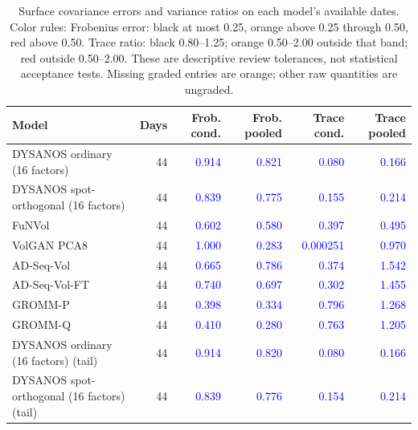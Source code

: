 \documentclass[11pt]{article}
\begin{document}
\begin{table}[H]\centering\small\setlength{\tabcolsep}{4pt}
\caption{Surface covariance errors and variance ratios on each model's available dates. Color rules: Frobenius error: black at most 0.25, orange above 0.25 through 0.50, red above 0.50. Trace ratio: black 0.80--1.25; orange 0.50--2.00 outside that band; red outside 0.50--2.00. These are descriptive review tolerances, not statistical acceptance tests. Missing graded entries are orange; other raw quantities are ungraded.}\label{tab:surface-covariance}
\begin{tabular}{@{}lrrrrr@{}}
\toprule
Model & Days & Frob. cond. & Frob. pooled & Trace cond. & Trace pooled \\
\midrule
DYSANOS ordinary (16 factors) & 44 & \textcolor{blue}{0.914} & \textcolor{blue}{0.821} & \textcolor{blue}{0.080} & \textcolor{blue}{0.166} \\
DYSANOS spot-orthogonal (16 factors) & 44 & \textcolor{blue}{0.839} & \textcolor{blue}{0.775} & \textcolor{blue}{0.155} & \textcolor{blue}{0.214} \\
FuNVol & 44 & \textcolor{blue}{0.602} & \textcolor{blue}{0.580} & \textcolor{blue}{0.397} & \textcolor{blue}{0.495} \\
VolGAN PCA8 & 44 & \textcolor{blue}{1.000} & \textcolor{blue}{0.283} & \textcolor{blue}{0.000251} & \textcolor{blue}{0.970} \\
AD-Seq-Vol & 44 & \textcolor{blue}{0.665} & \textcolor{blue}{0.786} & \textcolor{blue}{0.374} & \textcolor{blue}{1.542} \\
AD-Seq-Vol-FT & 44 & \textcolor{blue}{0.740} & \textcolor{blue}{0.697} & \textcolor{blue}{0.302} & \textcolor{blue}{1.455} \\
GROMM-P & 44 & \textcolor{blue}{0.398} & \textcolor{blue}{0.334} & \textcolor{blue}{0.796} & \textcolor{blue}{1.268} \\
GROMM-Q & 44 & \textcolor{blue}{0.410} & \textcolor{blue}{0.280} & \textcolor{blue}{0.763} & \textcolor{blue}{1.205} \\
DYSANOS ordinary (16 factors) (tail) & 44 & \textcolor{blue}{0.914} & \textcolor{blue}{0.820} & \textcolor{blue}{0.080} & \textcolor{blue}{0.166} \\
DYSANOS spot-orthogonal (16 factors) (tail) & 44 & \textcolor{blue}{0.839} & \textcolor{blue}{0.776} & \textcolor{blue}{0.154} & \textcolor{blue}{0.214} \\
\bottomrule\end{tabular}\end{table}
\end{document}
